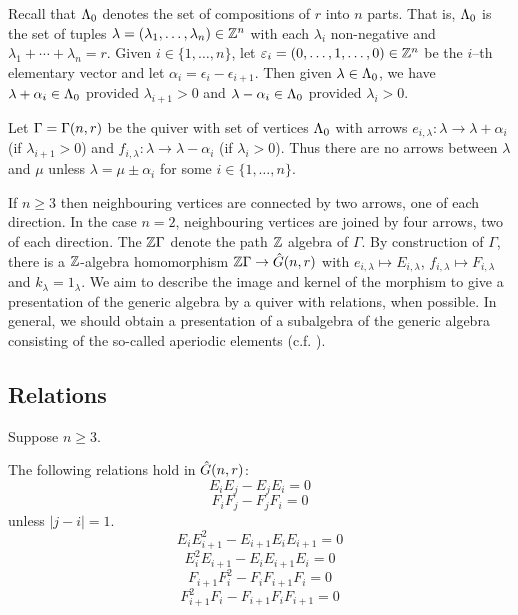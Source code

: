 \documentclass[a4paper, 11pt]{report}
\begin{document}
{\color{gray}
Recall that $\Lambda_0{}$ denotes the set of compositions of $r$ into $n$ parts. That is, $\Lambda_0{}$ is the set of tuples $\lambda = (\lambda_1,\ldots,\lambda_n)\in\mathbb{Z}^n$ with each $\lambda_i$ non-negative and $\lambda_1 +\cdots +\lambda_n = r$. Given $i\in \{1,\ldots,n\}$, let $\varepsilon_i = (0,\ldots,1,\ldots,0)\in\mathbb{Z}^n$ be the $i$--th elementary vector and let $\alpha_i = \epsilon_i - \epsilon_{i+1}$. Then given $\lambda\in\Lambda_0{}$, we have $\lambda + \alpha_i\in\Lambda_0{}$ provided $\lambda_{i+1}>0$ and $\lambda - \alpha_i\in\Lambda_0{}$ provided $\lambda_i>0$.

Let $\Gamma =\Gamma(n,r)$ be the quiver with set of vertices $\Lambda_0{}$ with arrows $e_{i,\lambda}\colon\lambda\to\lambda +\alpha_i$ (if $\lambda_{i+1}>0$) and $f_{i,\lambda}\colon\lambda\to\lambda -\alpha_i$ (if $\lambda_i>0$). Thus there are no arrows between $\lambda$ and $\mu$ unless $\lambda = \mu\pm \alpha_i$ for some $i\in \{1,\ldots,n\}$.

If $n\geq 3$ then neighbouring vertices are connected by two arrows, one of each direction. In the case $n=2$, neighbouring vertices are joined by four arrows, two of each direction. The $\mathbb{Z}\Gamma$ denote the path $\mathbb{Z}$ algebra of $\Gamma$. By construction of $\Gamma$, there is a $\mathbb{Z}$-algebra homomorphism $\mathbb{Z}\Gamma\to\hat{G}(n,r)$ with $e_{i,\lambda}\mapsto E_{i,\lambda}$, $f_{i,\lambda}\mapsto F_{i,\lambda}$ and $k_\lambda = 1_\lambda$. We aim to describe the image and kernel of the morphism to give a presentation of the generic algebra by a quiver with relations, when possible. In general, we should obtain a presentation of a subalgebra of the generic algebra consisting of the so-called aperiodic elements (c.f. \cite{lusztig99}).


\subsection{Relations}

Suppose $n\geq 3$.

\begin{lemma}
The following relations hold in $\hat{G}(n,r)$:
\begin{equation*}
E_iE_j - E_jE_i = 0
\end{equation*}
\begin{equation*}
F_iF_j - F_jF_i = 0
\end{equation*}
unless $|j-i|=1$.
\begin{equation*}
E_iE_{i+1}^2 - E_{i+1}E_iE_{i+1} = 0
\end{equation*}
\begin{equation*}
E_i^2E_{i+1} - E_iE_{i+1}E_i = 0
\end{equation*}
\begin{equation*}
F_{i+1}F_i^2 - F_iF_{i+1}F_i = 0
\end{equation*}
\begin{equation*}
F_{i+1}^2F_i - F_{i+1}F_iF_{i+1} = 0
\end{equation*}


\end{lemma}}
\end{document}
